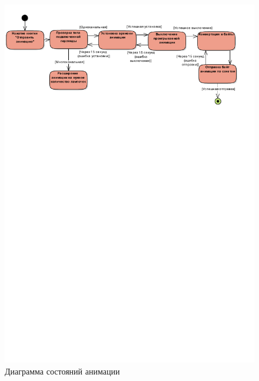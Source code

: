 ~
\begin{figure}[H]
\centering
	\includegraphics[scale=0.9]{figures/uml_state.pdf}
	\caption{Диаграмма состояний анимации}
	\label{fig:develop:umlDiagrams:state}
\end{figure}
